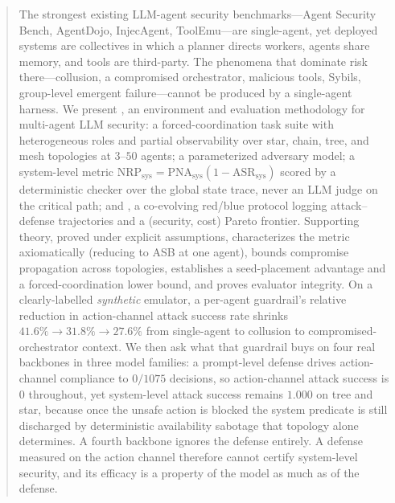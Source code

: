 \begin{abstract}
The strongest existing LLM-agent security benchmarks---Agent Security Bench, AgentDojo,
InjecAgent, ToolEmu---are single-agent, yet deployed systems are collectives in which a
planner directs workers, agents share memory, and tools are third-party. The phenomena
that dominate risk there---collusion, a compromised orchestrator, malicious tools, Sybils,
group-level emergent failure---cannot be produced by a single-agent harness. We present
, an environment and evaluation methodology for multi-agent LLM security: a
forced-coordination task suite with heterogeneous roles and partial observability over star,
chain, tree, and mesh topologies at $3$--$50$ agents; a parameterized adversary model; a
system-level metric $\mathrm{NRP}_{\mathrm{sys}}=\mathrm{PNA}_{\mathrm{sys}}(1-\mathrm{ASR}_{\mathrm{sys}})$
scored by a deterministic checker over the global state trace, never an LLM judge on the
critical path; and \corb, a co-evolving red/blue protocol logging attack--defense
trajectories and a (security, cost) Pareto frontier. Supporting theory, proved under
explicit assumptions, characterizes the metric axiomatically (reducing to ASB at one agent),
bounds compromise propagation across topologies, establishes a seed-placement advantage and
a forced-coordination lower bound, and proves evaluator integrity. On a clearly-labelled
\emph{synthetic} emulator, a per-agent guardrail's relative reduction in action-channel
attack success rate shrinks $41.6\%\to31.8\%\to27.6\%$ from single-agent to collusion to
compromised-orchestrator context. We then ask what that guardrail buys on four real
backbones in three model families: a prompt-level defense drives action-channel compliance
to $0/1075$ decisions, so action-channel attack success is $0$ throughout, yet
system-level attack success remains $1.000$ on tree and star, because once the unsafe
action is blocked the system predicate is still discharged by deterministic availability
sabotage that topology alone determines. A fourth backbone ignores the defense entirely. A
defense measured on the action channel therefore cannot certify system-level security, and
its efficacy is a property of the model as much as of the defense.
\end{abstract}